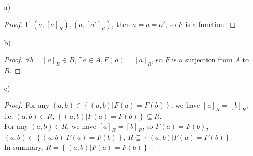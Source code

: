\documentclass{article}
\begin{document}
\begin{itemize}
    \item [a)]
    \begin{proof}
        If $\left(a, [a]_R\right), \left(a, [a']_R\right)$, then $a = a = a'$, so $F$ is a function.
    \end{proof}
    \item [b)] 
    \begin{proof}
        $\forall b = [a]_R \in B$, $\exists a \in A, F(a) = [a]_R$, so $F$ is a surjection from $A$ to $B$.
    \end{proof}
    \item [c)]
    \begin{proof}
        For any $(a, b) \in \left\{(a, b) | F(a) = F(b)\right\}$, we have $[a]_R = [b]_R$, i.e. $(a, b) \in R$, $\left\{(a, b) | F(a) = F(b)\right\} \subseteq R$. \\
        For any $(a, b) \in R$, we have $[a]_R = [b]_R$, so $F(a) = F(b)$, $(a, b) \in \left\{(a, b) | F(a) = F(b)\right\}$, $R \subseteq \left\{(a, b) | F(a) = F(b)\right\}$. \\
        In summary, $R =  \left\{(a, b) | F(a) = F(b)\right\}$
    \end{proof}
\end{itemize}

\section{}
\end{document}
